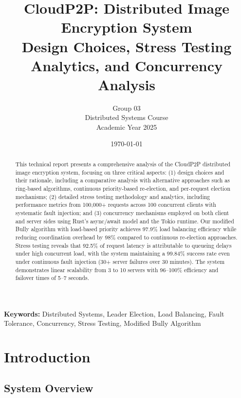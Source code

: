 \documentclass[12pt,a4paper]{article}
\title{
    \vspace{2cm}
    \Huge\textbf{CloudP2P: Distributed Image Encryption System} \\
    \vspace{0.5cm}
    \Large Design Choices, Stress Testing Analytics, and Concurrency Analysis \\
    \vspace{1cm}
}
\author{
    \Large Group 03 \\
    \vspace{0.3cm}
    \normalsize Distributed Systems Course \\
    \normalsize Academic Year 2025
}
\date{\today}
\begin{document}
\maketitle
\thispagestyle{empty}
\newpage

\begin{abstract}
\noindent
This technical report presents a comprehensive analysis of the CloudP2P distributed image encryption system, focusing on three critical aspects: (1) design choices and their rationale, including a comparative analysis with alternative approaches such as ring-based algorithms, continuous priority-based re-election, and per-request election mechanisms; (2) detailed stress testing methodology and analytics, including performance metrics from 100,000+ requests across 100 concurrent clients with systematic fault injection; and (3) concurrency mechanisms employed on both client and server sides using Rust's async/await model and the Tokio runtime. Our modified Bully algorithm with load-based priority achieves 97.9\% load balancing efficiency while reducing coordination overhead by 98\% compared to continuous re-election approaches. Stress testing reveals that 92.5\% of request latency is attributable to queueing delays under high concurrent load, with the system maintaining a 99.84\% success rate even under continuous fault injection (30+ server failures over 30 minutes). The system demonstrates linear scalability from 3 to 10 servers with 96--100\% efficiency and failover times of 5--7 seconds.
\end{abstract}

\vspace{1cm}
\noindent\textbf{Keywords:} Distributed Systems, Leader Election, Load Balancing, Fault Tolerance, Concurrency, Stress Testing, Modified Bully Algorithm

\newpage

\tableofcontents
\newpage

\listoffigures
\newpage

\listoftables
\newpage

\section{Introduction}

\subsection{System Overview}
\end{document}
